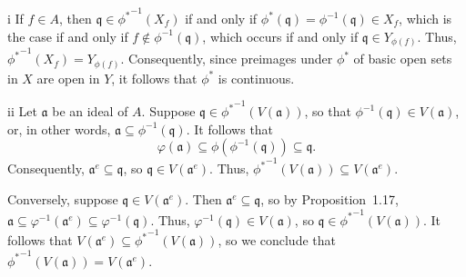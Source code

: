 \begin{partsolution}{i}
If \(f \in A\), then \(\mathfrak{q} \in {\phi^*}^{-1}(X_f)\) if and only if \(\phi^*(\mathfrak{q}) = \phi^{-1}(\mathfrak{q}) \in X_f\), which is the case if and only if \(f \notin \phi^{-1}(\mathfrak{q})\), which occurs if and only if \(\mathfrak{q} \in Y_{\phi(f)}\).
Thus, \({\phi^*}^{-1}(X_f) = Y_{\phi(f)}\).
Consequently, since preimages under \(\phi^*\) of basic open sets in \(X\) are open in \(Y\), it follows that \(\phi^*\) is continuous.
\end{partsolution}

\begin{partsolution}{ii}
Let \(\mathfrak{a}\) be an ideal of \(A\).
Suppose \(\mathfrak{q} \in {\phi^*}^{-1}(V(\mathfrak{a}))\), so that \(\phi^{-1}(\mathfrak{q}) \in V(\mathfrak{a})\), or, in other words, \(\mathfrak{a} \subseteq \phi^{-1}(\mathfrak{q})\).
It follows that
\begin{equation*}
\varphi(\mathfrak{a}) \subseteq \phi(\phi^{-1}(\mathfrak{q})) \subseteq \mathfrak{q}.
\end{equation*}
Consequently, \(\mathfrak{a}^e \subseteq \mathfrak{q}\), so \(\mathfrak{q} \in V(\mathfrak{a}^e)\).
Thus, \({\phi^*}^{-1}(V(\mathfrak{a})) \subseteq V(\mathfrak{a}^e)\).

Conversely, suppose \(\mathfrak{q} \in V(\mathfrak{a}^e)\).
Then \(\mathfrak{a}^e \subseteq \mathfrak{q}\), so by Proposition~1.17, \(\mathfrak{a} \subseteq \varphi^{-1}(\mathfrak{a}^e) \subseteq \varphi^{-1}(\mathfrak{q})\).
Thus, \(\varphi^{-1}(\mathfrak{q}) \in V(\mathfrak{a})\), so \(\mathfrak{q} \in {\phi^*}^{-1}(V(\mathfrak{a}))\).
It follows that \(V(\mathfrak{a}^e) \subseteq {\phi^*}^{-1}(V(\mathfrak{a}))\), so we conclude that \({\phi^*}^{-1}(V(\mathfrak{a})) = V(\mathfrak{a}^e)\).
\end{partsolution}

